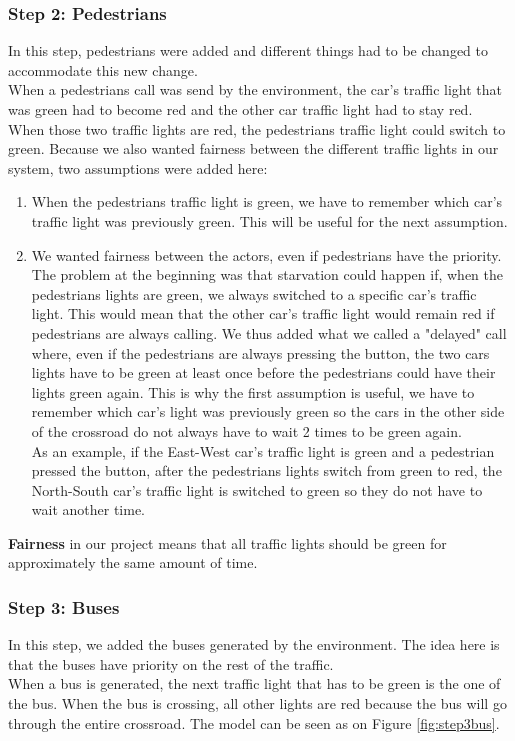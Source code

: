 \subsubsection{Step 2: Pedestrians}
In this step, pedestrians were added and different things had to be changed to accommodate this new change. \\ 

When a pedestrians call was send by the environment, the car's traffic light that was green had to become red and the other car traffic light had to stay red. When those two traffic lights are red, the pedestrians traffic light could switch to green. Because we also wanted fairness between the different traffic lights in our system, two assumptions were added here:
\begin{enumerate}
    \item When the pedestrians traffic light is green, we have to remember which car's traffic light was previously green. This will be useful for the next assumption.
    \item We wanted fairness between the actors, even if pedestrians have the priority. The problem at the beginning was that starvation could happen if, when the pedestrians lights are green, we always switched to a specific car's traffic light. This would mean that the other car's traffic light would remain red if pedestrians are always calling. We thus added what we called a "delayed" call where, even if the pedestrians are always pressing the button, the two cars lights have to be green at least once before the pedestrians could have their lights green again. This is why the first assumption is useful, we have to remember which car's light was previously green so the cars in the other side of the crossroad do not always have to wait 2 times to be green again. \\
    As an example, if the East-West car's traffic light is green and a pedestrian pressed the button, after the pedestrians lights switch from green to red, the North-South car's traffic light is switched to green so they do not have to wait another time.
\end{enumerate}
\textbf{Fairness} in our project means that all traffic lights should be green for approximately the same amount of time.

\subsubsection{Step 3: Buses}\label{sec:step3}
In this step, we added the buses generated by the environment. The idea here is that the buses have priority on the rest of the traffic. \\
When a bus is generated, the next traffic light that has to be green is the one of the bus. When the bus is crossing, all other lights are red because the bus will go through the entire crossroad. The model can be seen as on Figure \ref{fig:step3bus}. \\

